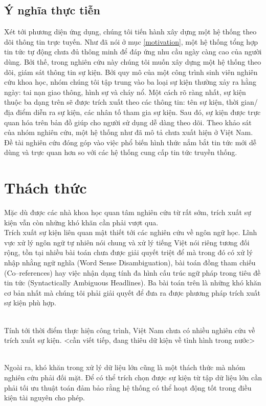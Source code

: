     \subsection{Ý nghĩa thực tiễn}

\noindent Xét tới  phương diện  ứng dụng, chúng tôi tiến hành xây dựng một hệ thống theo dõi thông tin trực tuyến. Như đã nói ở mục \ref{motivation}, một hệ thống tổng hợp tin tức tự động chưa đủ thông minh để đáp ứng nhu cầu ngày càng cao của người dùng. Bởi thế, trong nghiên cứu này chúng tôi muốn xây dựng một hệ thống theo dõi, giám sát thông tin sự kiện. Bởi quy mô của một công trình sinh viên nghiên cứu khoa học, nhóm chúng tôi tập trung vào ba loại sự kiện thường xảy ra hằng ngày: tai nạn giao thông, hình sự và cháy nổ. Một cách rõ ràng nhất, sự kiện thuộc ba dạng trên sẽ được trích xuất theo các thông tin: tên sự kiện, thời gian/địa điểm diễn ra sự kiện, các nhân tố tham gia sự kiện. Sau đó, sự kiện được trực quan hóa trên  bản đồ giúp cho người sử dụng dễ dàng theo dõi. Theo khảo sát của nhóm nghiên cứu, một hệ thống như đã mô tả chưa xuất hiện ở Việt Nam. Đề tài nghiên cứu đóng góp vào việc phổ biến hình thức nắm bắt tin tức mới dễ dùng và trực quan hơn so với các hệ thống cung cấp tin tức truyền thống.


 \section{Thách thức}
   \noindent  Mặc dù được các nhà khoa học quan tâm nghiên cứu  từ rất sớm, trích xuất sự kiện vẫn còn những khó khăn cần phải vượt qua. \\
\noindent Trích xuất sự kiện liên quan mật thiết tới các nghiên cứu về ngôn ngữ học. Lĩnh vực xử lý ngôn ngữ tự nhiên nói chung và xử lý tiếng Việt nói riêng tương đối rộng, tồn tại nhiều bài toán chưa được giải quyết triệt để mà trong đó có  xử lý nhập nhằng ngữ nghĩa (Word Sense Disambiguation), bài toán đồng tham chiếu (Co--references) hay việc nhận dạng tính đa hình cấu trúc ngữ pháp trong tiêu đề tin tức (Syntactically  Ambiguous Headlines). Ba bài toán trên là những khó khăn cơ bản nhất mà chúng tôi phải giải quyết để đưa ra được phương pháp trích xuất sự kiện phù hợp.

\\
\noindent Tính tới thời điểm thực hiện công trình, Việt Nam chưa có nhiều nghiên cứu về trích xuất sự kiện. <cần viết tiếp, đang thiêu dữ kiện về tình hình trong nước>

\\
\noindent Ngoài ra, khó khăn trong xử lý dữ liệu lớn cũng là một thách thức mà nhóm nghiên cứu phải đối mặt. Để có thể trích chọn được sự kiện từ tập dữ liệu lớn cần phải tối ưu thuật toán đảm bảo rằng hệ thống có thể hoạt động tốt trong điều kiện tài nguyên cho phép.


